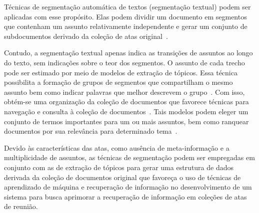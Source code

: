 


Técnicas de segmentação automática de textos (segmentação textual) podem ser aplicadas com esse propósito. Elas podem dividir um documento em segmentos que contenham um assunto relativamente independente e gerar um conjunto de subdocumentos derivado da coleção de atas original~\cite{Aggarwal2018, bokaei2015, sakahara2014, misra2009, Eis2008, choi2000}.






Contudo, a segmentação textual apenas indica as transições de assuntos ao longo do texto,  sem indicações sobre o teor dos segmentos. O assunto de cada trecho pode ser estimado por meio de modelos de extração de tópicos. Essa técnica possibilita a formação de grupos de segmentos que compartilham o mesmo assunto bem como indicar palavras que melhor descrevem o grupo~\cite{Wei2007}. Com isso, obtém-se uma organização da coleção de documentos que favorece técnicas para navegação e consulta à coleção de documentos~\cite{Maracini2010}. Tais modelos podem eleger um conjunto de termos importantes para um ou mais assuntos, bem como ranquear documentos por sua relevância para determinado tema~\cite{Faleiros2016,Xing2009}.








Devido às características das atas, como ausência de meta-informação e a multiplicidade de assuntos, as técnicas de segmentação podem ser empregadas em conjunto com as de extração de tópicos para gerar uma estrutura de dados derivada da coleção de documentos original que favoreça o uso de técnicas de aprendizado de máquina e recuperação de informação no desenvolvimento de um sistema para busca aprimorar a recuperação de informação em coleções de atas de reunião. 

